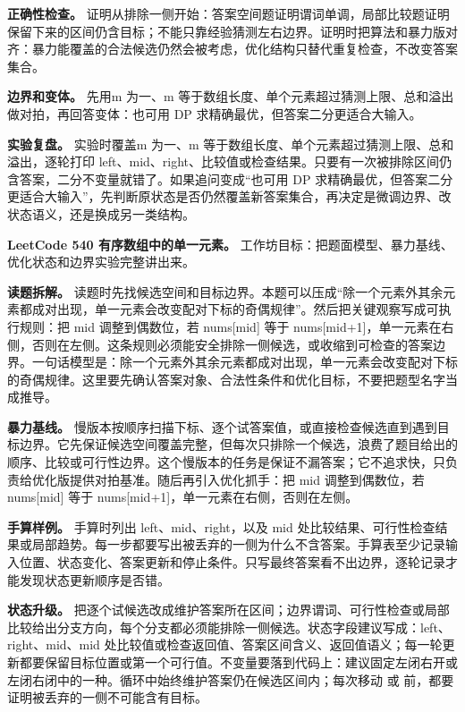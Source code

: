 \textbf{正确性检查。} 证明从排除一侧开始：答案空间题证明谓词单调，局部比较题证明保留下来的区间仍含目标；不能只靠经验猜测左右边界。证明时把算法和暴力版对齐：暴力能覆盖的合法候选仍然会被考虑，优化结构只替代重复检查，不改变答案集合。

\textbf{边界和变体。} 先用m 为一、m 等于数组长度、单个元素超过猜测上限、总和溢出做对拍，再回答变体：也可用 DP 求精确最优，但答案二分更适合大输入。

\textbf{实验复盘。} 实验时覆盖m 为一、m 等于数组长度、单个元素超过猜测上限、总和溢出，逐轮打印 left、mid、right、比较值或检查结果。只要有一次被排除区间仍含答案，二分不变量就错了。如果追问变成“也可用 DP 求精确最优，但答案二分更适合大输入”，先判断原状态是否仍然覆盖新答案集合，再决定是微调边界、改状态语义，还是换成另一类结构。

\noindent\textbf{LeetCode 540 有序数组中的单一元素。} 工作坊目标：把题面模型、暴力基线、优化状态和边界实验完整讲出来。

\textbf{读题拆解。} 读题时先找候选空间和目标边界。本题可以压成“除一个元素外其余元素都成对出现，单一元素会改变配对下标的奇偶规律”。然后把关键观察写成可执行规则：把 mid 调整到偶数位，若 nums[mid] 等于 nums[mid+1]，单一元素在右侧，否则在左侧。这条规则必须能安全排除一侧候选，或收缩到可检查的答案边界。一句话模型是：除一个元素外其余元素都成对出现，单一元素会改变配对下标的奇偶规律。这里要先确认答案对象、合法性条件和优化目标，不要把题型名字当成推导。

\textbf{暴力基线。} 慢版本按顺序扫描下标、逐个试答案值，或直接检查候选直到遇到目标边界。它先保证候选空间覆盖完整，但每次只排除一个候选，浪费了题目给出的顺序、比较或可行性边界。这个慢版本的任务是保证不漏答案；它不追求快，只负责给优化版提供对拍基准。随后再引入优化抓手：把 mid 调整到偶数位，若 nums[mid] 等于 nums[mid+1]，单一元素在右侧，否则在左侧。

\textbf{手算样例。} 手算时列出 left、mid、right，以及 mid 处比较结果、可行性检查结果或局部趋势。每一步都要写出被丢弃的一侧为什么不含答案。手算表至少记录输入位置、状态变化、答案更新和停止条件。只写最终答案看不出边界，逐轮记录才能发现状态更新顺序是否错。

\textbf{状态升级。} 把逐个试候选改成维护答案所在区间；边界谓词、可行性检查或局部比较给出分支方向，每个分支都必须能排除一侧候选。状态字段建议写成：left、right、mid、mid 处比较值或检查返回值、答案区间含义、返回值语义；每一轮更新都要保留目标位置或第一个可行值。不变量要落到代码上：建议固定左闭右开或左闭右闭中的一种。循环中始终维护答案仍在候选区间内；每次移动  或  前，都要证明被丢弃的一侧不可能含有目标。

